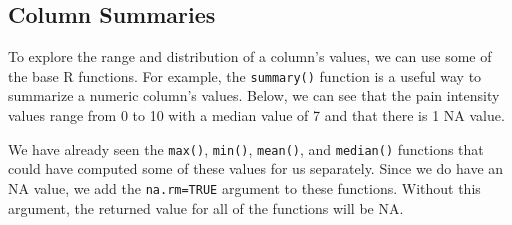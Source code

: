 \documentclass[
  letterpaper,
]{krantz}
\makeatletter
\newenvironment{Shaded}{\begin{snugshade}}{\end{snugshade}}
\newcommand{\AttributeTok}[1]{\textcolor[rgb]{0.40,0.45,0.13}{#1}}
\newcommand{\CommentTok}[1]{\textcolor[rgb]{0.37,0.37,0.37}{#1}}
\newcommand{\ConstantTok}[1]{\textcolor[rgb]{0.56,0.35,0.01}{#1}}
\newcommand{\DecValTok}[1]{\textcolor[rgb]{0.68,0.00,0.00}{#1}}
\newcommand{\FunctionTok}[1]{\textcolor[rgb]{0.28,0.35,0.67}{#1}}
\newcommand{\NormalTok}[1]{\textcolor[rgb]{0.00,0.23,0.31}{#1}}
\newcommand{\SpecialCharTok}[1]{\textcolor[rgb]{0.37,0.37,0.37}{#1}}
\newcommand{\StringTok}[1]{\textcolor[rgb]{0.13,0.47,0.30}{#1}}
\newenvironment{kframe}{%
\medskip{}
\setlength{\fboxsep}{.8em}
 \def\at@end@of@kframe{}%
 \ifinner\ifhmode%
  \def\at@end@of@kframe{\end{minipage}}%
  \begin{minipage}{\columnwidth}%
 \fi\fi%
 \def\FrameCommand##1{\hskip\@totalleftmargin \hskip-\fboxsep
 \colorbox{shadecolor}{##1}\hskip-\fboxsep
     \hskip-\linewidth \hskip-\@totalleftmargin \hskip\columnwidth}%
 \MakeFramed {\advance\hsize-\width
   \@totalleftmargin\z@ \linewidth\hsize
   \@setminipage}}%
 {\par\unskip\endMakeFramed%
 \at@end@of@kframe}
\renewenvironment{Shaded}{\begin{kframe}}{\end{kframe}}
\makeatother
\begin{document}
\begin{Shaded}
\end{Shaded}

\hypertarget{column-summaries}{%
\subsection{Column Summaries}\label{column-summaries}}

To explore the range and distribution of a column's values, we can use
some of the base R functions. For example, the \texttt{summary()}
function is a useful way to summarize a numeric column's values. Below,
we can see that the pain intensity values range from 0 to 10 with a
median value of 7 and that there is 1 NA value.

\begin{Shaded}
\end{Shaded}

We have already seen the \texttt{max()}, \texttt{min()},
\texttt{mean()}, and \texttt{median()} functions that could have
computed some of these values for us separately. Since we do have an NA
value, we add the \texttt{na.rm=TRUE} argument to these functions.
Without this argument, the returned value for all of the functions will
be NA.

\begin{Shaded}
\end{Shaded}
\end{document}
